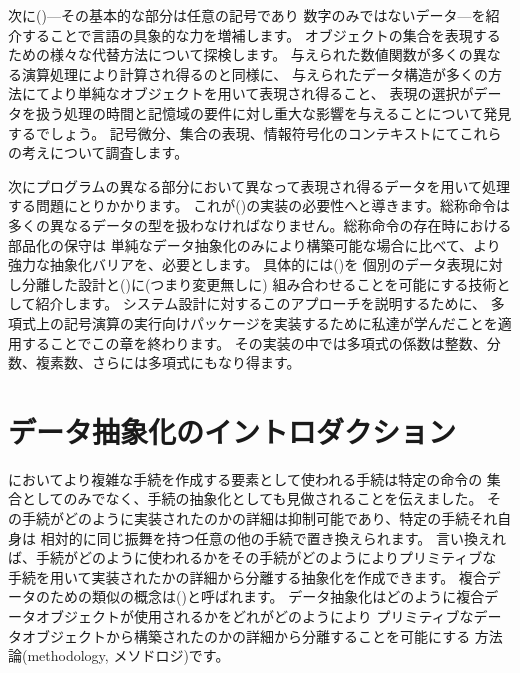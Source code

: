 次に()---その基本的な部分は任意の記号であり
数字のみではないデータ---を紹介することで言語の具象的な力を増補します。
オブジェクトの集合を表現するための様々な代替方法について探検します。
与えられた数値関数が多くの異なる演算処理により計算され得るのと同様に、
与えられたデータ構造が多くの方法にてより単純なオブジェクトを用いて表現され得ること、
表現の選択がデータを扱う処理の時間と記憶域の要件に対し重大な影響を与えることについて発見するでしょう。
記号微分、集合の表現、情報符号化のコンテキストにてこれらの考えについて調査します。


次にプログラムの異なる部分において異なって表現され得るデータを用いて処理する問題にとりかかります。 
これが()の実装の必要性へと導きます。総称命令は
多くの異なるデータの型を扱わなければなりません。総称命令の存在時における部品化の保守は
単純なデータ抽象化のみにより構築可能な場合に比べて、より強力な抽象化バリアを、必要とします。
具体的には()を
個別のデータ表現に対し分離した設計と()に(つまり変更無しに)
組み合わせることを可能にする技術として紹介します。
システム設計に対するこのアプローチを説明するために、
多項式上の記号演算の実行向けパッケージを実装するために私達が学んだことを適用することでこの章を終わります。
その実装の中では多項式の係数は整数、分数、複素数、さらには多項式にもなり得ます。


\section{データ抽象化のイントロダクション}
\label{Section 2.1}



においてより複雑な手続を作成する要素として使われる手続は特定の命令の
集合としてのみでなく、手続の抽象化としても見做されることを伝えました。
その手続がどのように実装されたのかの詳細は抑制可能であり、特定の手続それ自身は
相対的に同じ振舞を持つ任意の他の手続で置き換えられます。
言い換えれば、手続がどのように使われるかをその手続がどのようによりプリミティブな
手続を用いて実装されたかの詳細から分離する抽象化を作成できます。
複合データのための類似の概念は()と呼ばれます。
データ抽象化はどのように複合データオブジェクトが使用されるかをどれがどのようにより
プリミティブなデータオブジェクトから構築されたのかの詳細から分離することを可能にする
方法論(methodology, メソドロジ)です。



